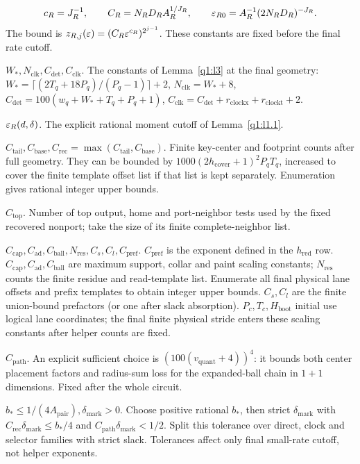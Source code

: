 \[
c_R=J_R^{-1},\qquad C_R=N_RD_RA_R^{1/J_R},\qquad
 \varepsilon_{R0}=A_R^{-1}(2N_RD_R)^{-J_R}.
\]
The bound is \(z_{R,j}(\varepsilon)=(C_R\varepsilon^{c_R})^{2^{j-1}}\). These constants are fixed before the final rate cutoff.\par\smallskip
\noindent\textbf{\(W_{*},N_{\mathrm{clk}},C_{\mathrm{det}},C_{\mathrm{clk}}\)}. The constants of Lemma~\ref{q1:l3} at the final geometry: \(W_{*}=\lceil (2T_{q}+18P_{q})/(P_{q}-1)\rceil+2\), \(N_{\mathrm{clk}}=W_{*}+8\), \(C_{\mathrm{det}}=100(w_{q}+W_{*}+T_{q}+P_{q}+1)\), \(C_{\mathrm{clk}}=C_{\mathrm{det}}+r_{\mathrm{clockx}}+r_{\mathrm{clockt}}+2\).\par\smallskip
\noindent\textbf{\(\varepsilon_{R}(d,\delta)\)}. The explicit rational moment cutoff of Lemma~\ref{q1:l1.1}.\par\smallskip
\noindent\textbf{\(C_{\mathrm{tail}},C_{\mathrm{base}},C_{\mathrm{rec}}=\max (C_{\mathrm{tail}},C_{\mathrm{base}})\)}. Finite key-center and footprint counts after full geometry. They can be bounded by \(1000(2h_{\mathrm{cover}}+1)^{2}P_{q} T_{q}\), increased to cover the finite template offset list if that list is kept separately. Enumeration gives rational integer upper bounds.\par\smallskip
\noindent\textbf{\(C_{\mathrm{top}}\)}. Number of top output, home and port-neighbor tests used by the fixed recovered nonport; take the size of its finite complete-neighbor list.\par\smallskip
\noindent\textbf{\(C_{\mathrm{cap}},C_{\mathrm{ad}},C_{\mathrm{ball}},N_{\mathrm{res}},C_{s},C_{l},C_{\mathrm{pref}}\)}. \(C_{\mathrm{pref}}\) is the exponent defined in the \(h_{\mathrm{red}}\) row. \(C_{\mathrm{cap}},C_{\mathrm{ad}},C_{\mathrm{ball}}\) are maximum support, collar and paint scaling constants; \(N_{\mathrm{res}}\) counts the finite residue and read-template list. Enumerate all final physical lane offsets and prefix templates to obtain integer upper bounds. \(C_{s},C_{l}\) are the finite union-bound prefactors (or one after slack absorption). \(P_{c},T_{c},H_{\mathrm{boot}}\) initial use logical lane coordinates; the final finite physical stride enters these scaling constants after helper counts are fixed.\par\smallskip
\noindent\textbf{\(C_{\mathrm{path}}\)}. An explicit sufficient choice is \((100(v_{\mathrm{quant}}+4))^{4}\): it bounds both center placement factors and radius-sum loss for the expanded-ball chain in \(1+1\) dimensions. Fixed after the whole circuit.\par\smallskip
\noindent\textbf{\(b_{*}\le 1/(4A_{\mathrm{pair}}),\delta_{\mathrm{mark}}>0\)}. Choose positive rational \(b_{*}\), then strict \(\delta_{\mathrm{mark}}\) with \(C_{\mathrm{rec}} \delta_{\mathrm{mark}}\le b_{*}/4\) and \(C_{\mathrm{path}} \delta_{\mathrm{mark}}<1/2\). Split this tolerance over direct, clock and selector families with strict slack. Tolerances affect only final small-rate cutoff, not helper exponents.\par\smallskip
